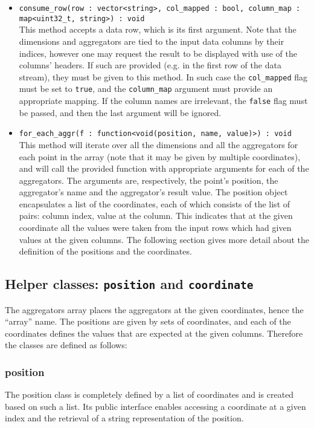 \documentclass{report}
\begin{document}
	\begin{itemize}
		\item \texttt{consume\_row(row : vector<string>, col\_mapped : bool,
			column\_map : map<uint32\_t, string>) : void}\\
			This method accepts a data row, which is its first argument.
			Note that the dimensions and aggregators are tied to the input
			data columns by their indices, however one may request the
			result to be displayed with use of the columns' headers. If
			such are provided (e.g. in the first row of the data stream),
			they must be given to this method. In such case the 
			\texttt{col\_mapped} flag must be set to \texttt{true}, and
			the \texttt{column\_map} argument must provide an appropriate
			mapping. If the column names are irrelevant, the \texttt{false}
			flag must be passed, and then the last argument will be ignored.
		\item \texttt{for\_each\_aggr(f : function<void(position, name, value)>) :
				void}\\
			This method will iterate over all the dimensions and all the
			aggregators for each point in the array (note that it may be
			given by multiple coordinates), and will call the provided
			function with appropriate arguments for each of the aggregators.
			The arguments are, respectively, the point's position, the
			aggregator's name and the aggregator's result value. The position
			object encapsulates a list of the coordinates, each of which
			consists of the list of pairs: column index, value at the column.
			This indicates that at the given coordinate all the values were
			taken from the input rows which had given values at the given
			columns. The following section gives more detail about the
			definition of the positions and the coordinates.
	\end{itemize}

	\subsection{Helper classes: \texttt{position} and \texttt{coordinate}}
	The aggregators array places the aggregators at the given coordinates, hence the
	``array'' name. The positions are given by sets of coordinates, and each of the
	coordinates defines the values that are expected at the given columns. Therefore
	the classes are defined as follows:

	\subsubsection{position}
	The position class is completely defined by a list of coordinates and is created
	based on such a list. Its public interface enables accessing a coordinate at a
	given index and the retrieval of a string representation of the position.
\end{document}

